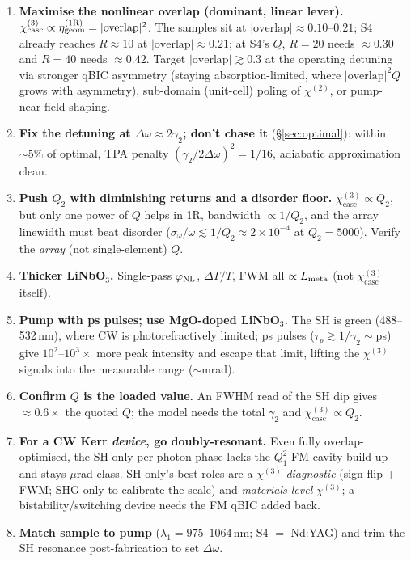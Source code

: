 \documentclass[11pt,a4paper]{article}
\newcommand{\chitwo}{\chi^{(2)}}
\newcommand{\chithree}{\chi^{(3)}}
\newcommand{\Dom}{\Delta\omega}
\newcommand{\geom}{{\rm geom}}
\newcommand{\chicasc}{\chithree_{\text{casc}}}
\newcommand{\etag}{\eta_{\geom}^{(1\mathrm R)}}
\begin{document}
\begin{enumerate}[label=\textbf{R\arabic*.},leftmargin=2.6em]
  \item \textbf{Maximise the nonlinear overlap (dominant, linear lever).}
        $\chicasc\propto\etag=|\text{overlap}|^2$. The samples sit at
        $|\text{overlap}|\!\approx\!0.10$--$0.21$; S4 already reaches $R\approx10$ at
        $|\text{overlap}|\!\approx\!0.21$; at S4's $Q$, $R=20$ needs $\approx\!0.30$ and
        $R=40$ needs $\approx\!0.42$. Target
        $|\text{overlap}|\!\gtrsim\!0.3$ at the operating detuning via stronger
        qBIC asymmetry (staying absorption-limited, where $|\text{overlap}|^2Q$
        grows with asymmetry), sub-domain (unit-cell) poling of $\chitwo$, or
        pump-near-field shaping.
  \item \textbf{Fix the detuning at $\Dom\approx2\gamma_2$; don't chase it}
        (\S\ref{sec:optimal}): within $\sim\!5\%$ of optimal, TPA penalty
        $(\gamma_2/2\Dom)^2=1/16$, adiabatic approximation clean.
  \item \textbf{Push $Q_2$ with diminishing returns and a disorder floor.}
        $\chicasc\propto Q_2$, but only one power of $Q$ helps in 1R, bandwidth
        $\propto1/Q_2$, and the array linewidth must beat disorder
        ($\sigma_\omega/\omega\lesssim1/Q_2\!\approx\!2\times10^{-4}$ at
        $Q_2=5000$). Verify the \emph{array} (not single-element) $Q$.
  \item \textbf{Thicker LiNbO$_3$.} Single-pass $\varphi_{\rm NL}$, $\Delta T/T$,
        FWM all $\propto L_{\rm meta}$ (not $\chicasc$ itself).
  \item \textbf{Pump with ps pulses; use MgO-doped LiNbO$_3$.} The SH is green
        (488--532\,nm), where CW is photorefractively limited; ps pulses
        ($\tau_p\!\gtrsim\!1/\gamma_2\!\sim\!$ps) give $10^2$--$10^3\times$ more peak
        intensity and escape that limit, lifting the $\chithree$ signals into the
        measurable range ($\sim$mrad).
  \item \textbf{Confirm $Q$ is the loaded value.} An FWHM read of the SH dip gives
        $\approx\!0.6\times$ the quoted $Q$; the model needs the total $\gamma_2$
        and $\chicasc\propto Q_2$.
  \item \textbf{For a CW Kerr \emph{device}, go doubly-resonant.} Even fully
        overlap-optimised, the SH-only per-photon phase lacks the $Q_1^2$ FM-cavity
        build-up and stays $\mu$rad-class. SH-only's best roles are a $\chithree$
        \emph{diagnostic} (sign flip + FWM; SHG only to calibrate the scale) and
        \emph{materials-level} $\chithree$; a bistability/switching device needs the
        FM qBIC added back.
  \item \textbf{Match sample to pump} ($\lambda_1=975$--$1064\,$nm; S4 $=$ Nd:YAG)
        and trim the SH resonance post-fabrication to set $\Dom$.
\end{enumerate}
\end{document}
